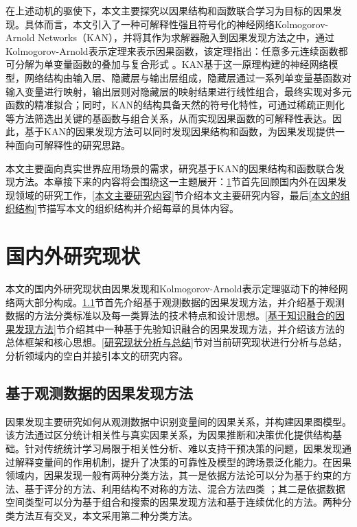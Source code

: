在上述动机的驱使下，本文主要探究以因果结构和函数联合学习为目标的因果发现。具体而言，本文引入了一种可解释性强且符号化的神经网络Kolmogorov-Arnold Networks（KAN），并将其作为求解器融入到因果发现方法之中，通过Kolmogorov-Arnold表示定理来表示因果函数，该定理指出：任意多元连续函数都可分解为单变量函数的叠加与复合形式 \cite{Ziming2025}。KAN基于这一原理构建的神经网络模型，网络结构由输入层、隐藏层与输出层组成，隐藏层通过一系列单变量基函数对输入变量进行映射，输出层则对隐藏层的映射结果进行线性组合，最终实现对多元函数的精准拟合；同时，KAN的结构具备天然的符号化特性，可通过稀疏正则化等方法筛选出关键的基函数与组合关系，从而实现因果函数的可解释性表达。因此，基于KAN的因果发现方法可以同时发现因果结构和函数，为因果发现提供一种面向可解释性的研究思路。

本文主要面向真实世界应用场景的需求，研究基于KAN的因果结构和函数联合发现方法。本章接下来的内容将会围绕这一主题展开：\ref{研究现状}节首先回顾国内外在因果发现领域的研究工作，\ref{本文主要研究内容}节介绍本文主要研究内容，最后\ref{本文的组织结构}节描写本文的组织结构并介绍每章的具体内容。


\section{国内外研究现状}
\label{研究现状}

本文的国内外研究现状由因果发现和Kolmogorov-Arnold表示定理驱动下的神经网络两大部分构成。\ref{基于观测数据的因果发现方法}节首先介绍基于观测数据的因果发现方法，并介绍基于观测数据的方法分类标准以及每一类算法的技术特点和设计思想。\ref{基于知识融合的因果发现方法}节介绍其中一种基于先验知识融合的因果发现方法，并介绍该方法的总体框架和核心思想。\ref{研究现状分析与总结}节对当前研究现状进行分析与总结，分析领域内的空白并接引本文的研究内容。

\subsection{基于观测数据的因果发现方法}
\label{基于观测数据的因果发现方法}

因果发现主要研究如何从观测数据中识别变量间的因果关系，并构建因果图模型。该方法通过区分统计相关性与真实因果关系，为因果推断和决策优化提供结构基础。针对传统统计学习局限于相关性分析、难以支持干预决策的问题，因果发现通过解释变量间的作用机制，提升了决策的可靠性及模型的跨场景泛化能力\cite{周婵2025}。在因果领域内，因果发现一般有两种分类方法，其一是依据方法论可以分为基于约束的方法、基于评分的方法、利用结构不对称的方法、混合方法四类 \cite{Vowels2022}；其二是依据数据空间类型可以分为基于组合和搜索的因果发现方法和基于连续优化的方法。两种分类方法互有交叉，本文采用第二种分类方法。

